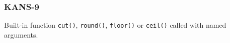 \subsubsection{KANS-9}\label{sec:error_code_kans_9}

Built-in function \texttt{cut()}, \texttt{round()}, \texttt{floor()} or \texttt{ceil()} called with named arguments.


